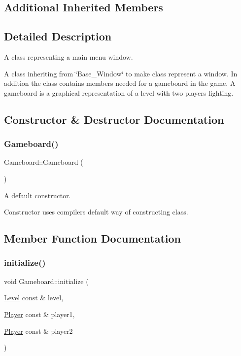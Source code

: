\subsection*{Additional Inherited Members}


\subsection{Detailed Description}
A class representing a main menu window. 

A class inheriting from \char`\"{}\+Base\+\_\+\+Window\char`\"{} to make class represent a window. In addition the class contains members needed for a gameboard in the game. A gameboard is a graphical representation of a level with two players fighting. 

\subsection{Constructor \& Destructor Documentation}
\mbox{\label{classGameboard_a35e7c6d4e378d0e62a5cd964933410cf}} 
\subsubsection{\texorpdfstring{Gameboard()}{Gameboard()}}
{\footnotesize\ttfamily Gameboard\+::\+Gameboard (\begin{DoxyParamCaption}{ }\end{DoxyParamCaption})\hspace{0.3cm}{\ttfamily [default]}}



A default constructor. 

Constructor uses compiler\textquotesingle{}s default way of constructing class. 

\subsection{Member Function Documentation}
\mbox{\label{classGameboard_a26dc97929c4382659d1f52bb0f8bb19a}} 
\subsubsection{\texorpdfstring{initialize()}{initialize()}}
{\footnotesize\ttfamily void Gameboard\+::initialize (\begin{DoxyParamCaption}\item[{\hyperlink{classLevel}{Level} const \&}]{level,  }\item[{\hyperlink{classPlayer}{Player} const \&}]{player1,  }\item[{\hyperlink{classPlayer}{Player} const \&}]{player2 }\end{DoxyParamCaption})}



